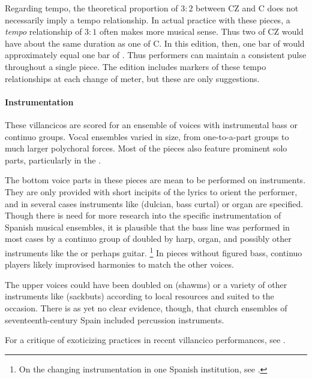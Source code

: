 Regarding tempo, the theoretical proportion of $3:2$ between CZ and C does not necessarily imply a tempo relationship.
In actual practice with these pieces, a \emph{tempo} relationship of $3:1$ often makes more musical sense.
Thus two  of CZ would have about the same duration as one  of C.
In this edition, then, one bar of  would approximately equal one bar of .
Thus performers can maintain a consistent pulse throughout a single piece.
The edition includes markers of these tempo relationships at each change of meter, but these are only suggestions.

\paragraph{Instrumentation}

These villancicos are scored for an ensemble of voices with instrumental bass or continuo groups.
Vocal ensembles varied in size, from one-to-a-part groups to much larger polychoral forces.
Most of the pieces also feature prominent solo parts, particularly in the .

The bottom voice parts in these pieces are mean to be performed on instruments. 
They are only provided with short incipits of the lyrics to orient the performer, and in several cases instruments like  (dulcian, bass curtal) or organ are specified.
Though there is need for more research into the specific instrumentation of Spanish musical ensembles, it is plausible that the bass line was performed in most cases by a continuo group of  doubled by harp, organ, and possibly other instruments like the  or perhaps guitar.%
  \footnote{On the changing instrumentation in one Spanish institution, see \autocite{Torrente:PhD}.}
In pieces without figured bass, continuo players likely improvised harmonies to match the other voices.

The upper voices could have been doubled on  (shawms) or a variety of other instruments like  (sackbuts) according to local resources and suited to the occasion.
There is as yet no clear evidence, though, that church ensembles of seventeenth-century Spain included percussion instruments.%
  \begin{Footnote}
  For a critique of exoticizing practices in recent villancico performances,  see \autocite{Baker:PerformancePostColonial}.
  \end{Footnote}

